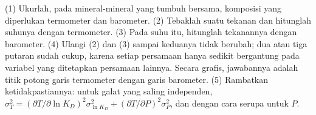 \begin{method}\label{met:b2:pt-paths:intersection}
(1) Ukurlah, pada mineral-mineral yang tumbuh bersama, komposisi yang diperlukan termometer dan
barometer. (2) Tebaklah suatu tekanan dan hitunglah suhunya dengan termometer.
(3) Pada suhu itu, hitunglah tekanannya dengan barometer. (4) Ulangi (2) dan (3)
sampai keduanya tidak berubah; dua atau tiga putaran sudah cukup, karena setiap persamaan hanya sedikit bergantung pada
variabel yang ditetapkan persamaan lainnya. Secara grafis, jawabannya adalah titik potong garis
termometer dengan garis barometer. (5) Rambatkan ketidakpastiannya: untuk
galat yang saling independen, $\sigma_T^2 = (\partial T/\partial\ln K_D)^2\sigma_{\ln K_D}^2 +
(\partial T/\partial P)^2\sigma_P^2$, dan dengan cara serupa untuk $P$.
\end{method}

